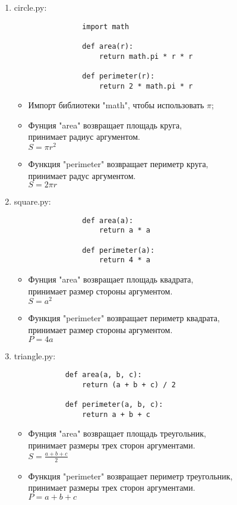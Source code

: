 \documentclass[a4paper,12pt]{report}
\begin{document}
\begin{enumerate}
			\newpage
			
		\item circle.py:
			\begin{lstlisting}
				import math
				
				def area(r):
					return math.pi * r * r
				
				def perimeter(r):
					return 2 * math.pi * r
			\end{lstlisting}
			\begin{itemize}
				\item Импорт библиотеки "math", чтобы использовать $\pi$;
				\item Фунция "area" возвращает площадь круга,\\ принимает радиус аргументом.\\
					  $S = \pi r^2$
				\item Функция "perimeter" возвращает периметр круга,\\ принимает радус аргументом.\\
					  $S = 2 \pi r$
			\end{itemize}
			
		\item square.py:
			\begin{lstlisting}
				def area(a):
					return a * a
				
				def perimeter(a):
					return 4 * a
			\end{lstlisting}
			\begin{itemize}
				\item Фунция "area" возвращает площадь квадрата,\\ принимает размер стороны аргументом.\\
					  $S = a^2$
				\item Функция "perimeter" возвращает периметр квадрата,\\ принимает размер стороны аргументом.\\
				      $P = 4a$
			\end{itemize}
			
		\newpage
			
		\item triangle.py:
		\begin{lstlisting}
			def area(a, b, c):
				return (a + b + c) / 2
			
			def perimeter(a, b, c):
				return a + b + c
		\end{lstlisting}
		\begin{itemize}
			\item Фунция "area" возвращает площадь треугольник,\\ принимает размеры трех сторон аргументами.\\
				  $S = \frac{a + b + c}{2}$
			\item Функция "perimeter" возвращает периметр треугольник,\\ принимает размеры трех сторон аргументами.\\
				  $P = a + b + c$
		\end{itemize}
	\end{enumerate}
	
\end{document}
